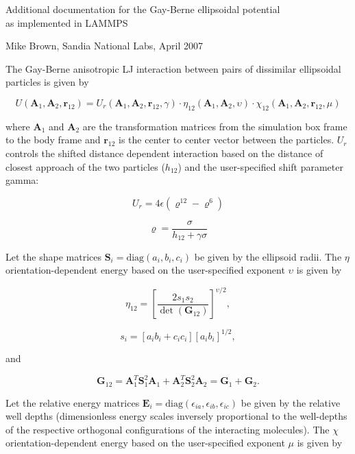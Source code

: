 


\begin{center}

\large{Additional documentation for the Gay-Berne ellipsoidal potential \\
  as implemented in LAMMPS}

\end{center}

\centerline{Mike Brown, Sandia National Labs, April 2007}

\vspace{0.3in}

The Gay-Berne anisotropic LJ interaction between pairs of dissimilar
ellipsoidal particles is given by

$$ U ( \mathbf{A}_1, \mathbf{A}_2, \mathbf{r}_{12} ) = U_r (
\mathbf{A}_1, \mathbf{A}_2, \mathbf{r}_{12}, \gamma ) \cdot \eta_{12} (
\mathbf{A}_1, \mathbf{A}_2, \upsilon ) \cdot \chi_{12} ( \mathbf{A}_1,
\mathbf{A}_2, \mathbf{r}_{12}, \mu ) $$

where $\mathbf{A}_1$ and $\mathbf{A}_2$ are the transformation
matrices from the simulation box frame to the body frame and
$\mathbf{r}_{12}$ is the center to center vector between the
particles.  $U_r$ controls the shifted distance dependent interaction
based on the distance of closest approach of the two particles
($h_{12}$) and the user-specified shift parameter gamma:

$$ U_r = 4 \epsilon ( \varrho^{12} - \varrho^6) $$

$$ \varrho = \frac{\sigma}{ h_{12} + \gamma \sigma} $$

Let the shape matrices $\mathbf{S}_i=\mbox{diag}(a_i, b_i, c_i)$ be 
given by the ellipsoid radii. The $\eta$ orientation-dependent energy 
based on the user-specified exponent $\upsilon$ is given by

$$ \eta_{12} = [ \frac{ 2 s_1 s_2 }{\det ( \mathbf{G}_{12} )}]^{
\upsilon / 2 } , $$

$$ s_i = [a_i b_i + c_i c_i][a_i b_i]^{ 1 / 2 }, $$

and

$$ \mathbf{G}_{12} = \mathbf{A}_1^T \mathbf{S}_1^2 \mathbf{A}_1 +
\mathbf{A}_2^T \mathbf{S}_2^2 \mathbf{A}_2 = \mathbf{G}_1 +
\mathbf{G}_2. $$

Let the relative energy matrices $\mathbf{E}_i = \mbox{diag}
(\epsilon_{ia}, \epsilon_{ib}, \epsilon_{ic})$ be given by 
the relative well depths (dimensionless energy scales 
inversely proportional to the well-depths of the respective 
orthogonal configurations of the interacting molecules). The 
$\chi$ orientation-dependent energy based on the user-specified 
exponent $\mu$ is given by


